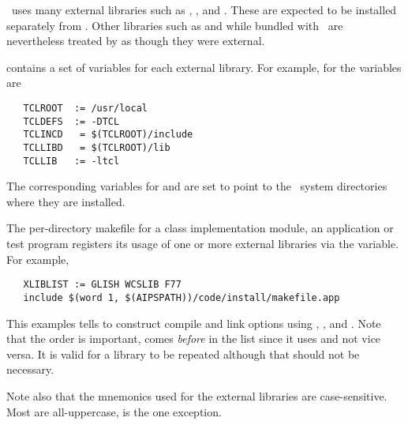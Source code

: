 \aipspp\ uses many external libraries such as , ,
and .  These are expected to be installed separately from \aipspp.
Other libraries such as  and  while bundled with
\aipspp\ are nevertheless treated by  as though they were
external.

 contains a set of variables for each external library.  For
example, for  the variables are

\begin{verbatim}
   TCLROOT  := /usr/local
   TCLDEFS  := -DTCL
   TCLINCD   = $(TCLROOT)/include
   TCLLIBD   = $(TCLROOT)/lib
   TCLLIB   := -ltcl
\end{verbatim}

\noindent
The corresponding variables for  and  are set to
point to the \aipspp\ system directories where they are installed.

The per-directory makefile for a class implementation module, an application
or test program registers its usage of one or more external libraries via the
 variable.  For example,

\begin{verbatim}
   XLIBLIST := GLISH WCSLIB F77
   include $(word 1, $(AIPSPATH))/code/install/makefile.app
\end{verbatim}

\noindent
This examples tells  to construct compile and link options
using , , and .  Note that the order
is important,  comes {\em before}  in the list since
it uses  and not vice versa.  It is valid for a library to be
repeated although that should not be necessary.

Note also that the mnemonics used for the external libraries are
case-sensitive.  Most are all-uppercase,  is the one exception.

